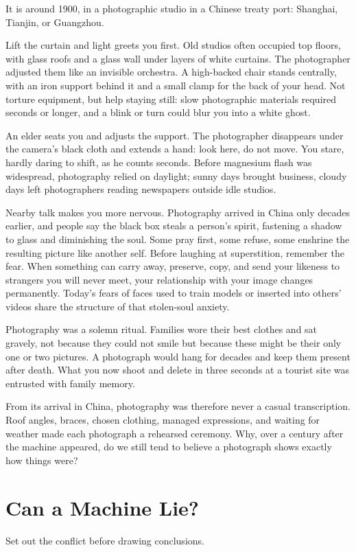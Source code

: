 It is around 1900, in a photographic studio in a Chinese treaty port: Shanghai, Tianjin, or Guangzhou.

Lift the curtain and light greets you first. Old studios often occupied top floors, with glass roofs and a glass wall under layers of white curtains. The photographer adjusted them like an invisible orchestra. A high-backed chair stands centrally, with an iron support behind it and a small clamp for the back of your head. Not torture equipment, but help staying still: slow photographic materials required seconds or longer, and a blink or turn could blur you into a white ghost.

An elder seats you and adjusts the support. The photographer disappears under the camera's black cloth and extends a hand: look here, do not move. You stare, hardly daring to shift, as he counts seconds. Before magnesium flash was widespread, photography relied on daylight; sunny days brought business, cloudy days left photographers reading newspapers outside idle studios.

Nearby talk makes you more nervous. Photography arrived in China only decades earlier, and people say the black box steals a person's spirit, fastening a shadow to glass and diminishing the soul. Some pray first, some refuse, some enshrine the resulting picture like another self. Before laughing at superstition, remember the fear. When something can carry away, preserve, copy, and send your likeness to strangers you will never meet, your relationship with your image changes permanently. Today's fears of faces used to train models or inserted into others' videos share the structure of that stolen-soul anxiety.

Photography was a solemn ritual. Families wore their best clothes and sat gravely, not because they could not smile but because these might be their only one or two pictures. A photograph would hang for decades and keep them present after death. What you now shoot and delete in three seconds at a tourist site was entrusted with family memory.

From its arrival in China, photography was therefore never a casual transcription. Roof angles, braces, chosen clothing, managed expressions, and waiting for weather made each photograph a rehearsed ceremony. Why, over a century after the machine appeared, do we still tend to believe a photograph shows exactly how things were?

\section{Can a Machine Lie?}
Set out the conflict before drawing conclusions.

